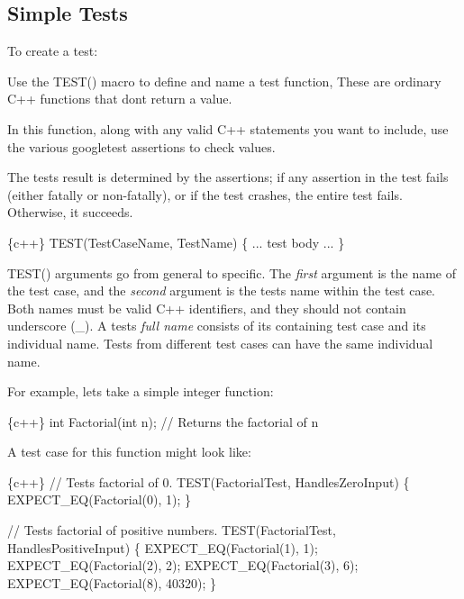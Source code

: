 \subsection*{Simple Tests}

To create a test\+:


\begin{DoxyEnumerate}
\item Use the {\ttfamily T\+E\+S\+T()} macro to define and name a test function, These are ordinary C++ functions that don\textquotesingle{}t return a value.
\end{DoxyEnumerate}
\begin{DoxyEnumerate}
\item In this function, along with any valid C++ statements you want to include, use the various googletest assertions to check values.
\end{DoxyEnumerate}
\begin{DoxyEnumerate}
\item The test\textquotesingle{}s result is determined by the assertions; if any assertion in the test fails (either fatally or non-\/fatally), or if the test crashes, the entire test fails. Otherwise, it succeeds.
\end{DoxyEnumerate}


\begin{DoxyCode}
\{c++\}
TEST(TestCaseName, TestName) \{
  ... test body ...
\}
\end{DoxyCode}


{\ttfamily T\+E\+S\+T()} arguments go from general to specific. The {\itshape first} argument is the name of the test case, and the {\itshape second} argument is the test\textquotesingle{}s name within the test case. Both names must be valid C++ identifiers, and they should not contain underscore ({\ttfamily \+\_\+}). A test\textquotesingle{}s {\itshape full name} consists of its containing test case and its individual name. Tests from different test cases can have the same individual name.

For example, let\textquotesingle{}s take a simple integer function\+:


\begin{DoxyCode}
\{c++\}
int Factorial(int n);  // Returns the factorial of n
\end{DoxyCode}


A test case for this function might look like\+:


\begin{DoxyCode}
\{c++\}
// Tests factorial of 0.
TEST(FactorialTest, HandlesZeroInput) \{
  EXPECT\_EQ(Factorial(0), 1);
\}

// Tests factorial of positive numbers.
TEST(FactorialTest, HandlesPositiveInput) \{
  EXPECT\_EQ(Factorial(1), 1);
  EXPECT\_EQ(Factorial(2), 2);
  EXPECT\_EQ(Factorial(3), 6);
  EXPECT\_EQ(Factorial(8), 40320);
\}
\end{DoxyCode}



